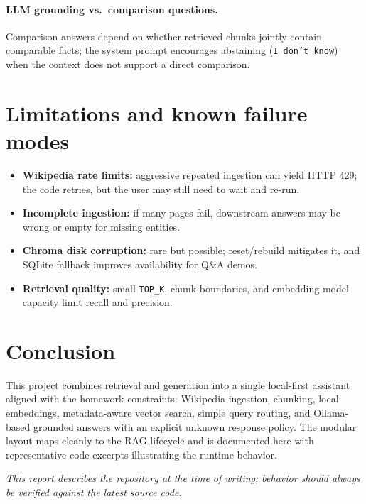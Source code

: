 \documentclass[11pt,a4paper]{article}
\begin{document}
\paragraph{LLM grounding vs.\ comparison questions.}
Comparison answers depend on whether retrieved chunks jointly contain comparable facts; the
system prompt encourages abstaining (\texttt{I don't know}) when the context does not support
a direct comparison.

\section{Limitations and known failure modes}

\begin{itemize}[leftmargin=*]
  \item \textbf{Wikipedia rate limits:} aggressive repeated ingestion can yield HTTP 429;
        the code retries, but the user may still need to wait and re-run.
  \item \textbf{Incomplete ingestion:} if many pages fail, downstream answers may be wrong
        or empty for missing entities.
  \item \textbf{Chroma disk corruption:} rare but possible; reset/rebuild mitigates it, and
        SQLite fallback improves availability for Q\&A demos.
  \item \textbf{Retrieval quality:} small \texttt{TOP\_K}, chunk boundaries, and embedding model
        capacity limit recall and precision.
\end{itemize}

\section{Conclusion}

This project combines retrieval and generation into a single local-first assistant aligned
with the homework constraints: Wikipedia ingestion, chunking, local embeddings, metadata-aware
vector search, simple query routing, and Ollama-based grounded answers with an explicit
unknown response policy. The modular layout maps cleanly to the RAG lifecycle and is
documented here with representative code excerpts illustrating the runtime behavior.

\vfill
\noindent\textit{This report describes the repository at the time of writing; behavior should
always be verified against the latest source code.}
\end{document}
